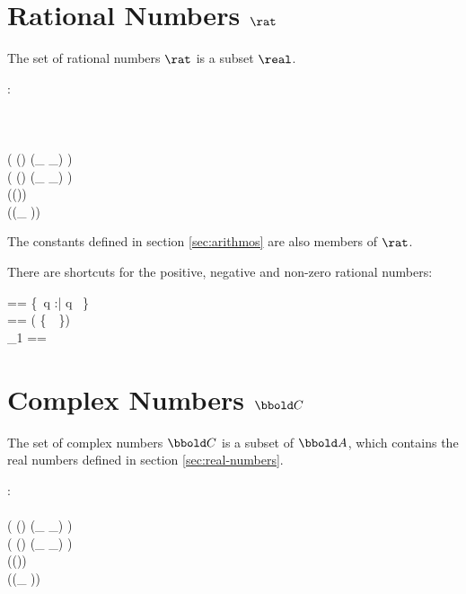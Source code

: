 \documentclass[12pt]{article}
\begin{document}
\section{Rational Numbers $\rat$}
\label{sec:rational-numbers}
The set of rational numbers $\rat$ is a subset $\real$.
%
\begin{axdef}
  \rat : \power \real
  \where
  \azero \in \rat\\
  \aone \in \rat\\
  \atwo \in \rat\\
  \aten \in \rat\\
  \ran ( (\rat \cross \rat) \dres (\_ \aplus \_) ) \subset \rat\\
  \ran ( (\rat \cross \rat) \dres (\_ \amult \_) ) \subset \rat\\
  \ran (\rat \dres (\aneg ))  \subset \rat\\
  \ran (\rat \dres (\_ \ainv ))  \subset \rat\\
\end{axdef}
The constants defined in section \ref{sec:arithmos} are also members
of $\rat$.

There are shortcuts for the positive, negative and non-zero rational numbers:
\begin{zed}
  \ratplus == \{~q :\rat | q \agt \azero~\}\\
  \ratminus == \rat \setminus ( \ratplus \cup \{~\azero~\}) \\
  \rat_1 == \ratplus \cup \ratminus \\
\end{zed}
%
\section{Complex Numbers $\complex$}
\label{sec:complex-numbers}
The set of complex numbers $\complex$ is a subset of $\arithmos$,
which contains the real numbers defined in section
\ref{sec:real-numbers}.
%
\begin{axdef}
  \complex : \power \arithmos\\
  \where
  \real \subset \complex \\
  \ran ( (\complex \cross \complex) \dres (\_ \aplus \_) ) \subset \complex\\
  \ran ( (\complex \cross \complex) \dres (\_ \amult \_) ) \subset \complex\\
  \ran (\complex \dres (\aneg ))  \subset \complex\\
  \ran (\complex \dres (\_ \ainv ))  \subset \complex\\
\end{axdef}
\end{document}
